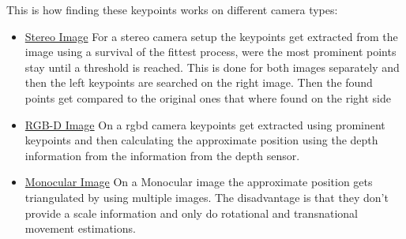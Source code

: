 This is how finding these keypoints works on different camera types:
\begin{itemize}
    \item \underline{Stereo Image} \newline
    For a stereo camera setup the keypoints get extracted from the image using a survival of the fittest process, were the most prominent points stay until a threshold is reached. This is done for both images separately and then the left keypoints are searched on the right image. Then the found points get compared to the original ones that where found on the right side
    \item \underline{RGB-D Image} \newline
    On a \gls{rgbd} camera keypoints get extracted using prominent keypoints and then calculating the approximate position using the depth information from the information from the depth sensor.
    \item \underline{Monocular Image} \newline
    On a Monocular image the approximate position gets triangulated by using multiple images. The disadvantage is that they don't provide a scale information and only do rotational and transnational movement estimations.
\end{itemize}


